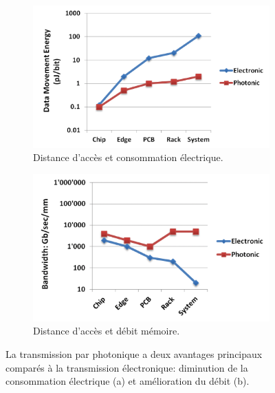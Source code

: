         
        \begin{figure}[t!]
            \centering
            \begin{subfigure}[t]{0.48\textwidth}
                \centering
                \includegraphics[width=\linewidth]{images/edl_photo_pj.png}
                \caption{\label{fig:edl_photo_pj} Distance d'accès et consommation électrique. } 
            \end{subfigure}\hfill
            \begin{subfigure}[t]{0.48\textwidth}
                \centering
                \includegraphics[width=\linewidth]{images/edl_photo_bw.png}
                \caption{\label{fig:edl_photo_bw} Distance d'accès et débit mémoire.}
            \end{subfigure}
            \caption{\label{fig:edl_photo} La transmission par photonique a deux avantages principaux comparés à la transmission électronique\cite{Lucas2014}: diminution de la consommation électrique (a) et amélioration du débit (b).}
        \end{figure}
    
